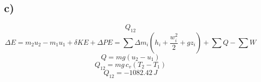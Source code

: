 

\subsection*{c)}
\[
Q_{12}
\]
\[
\Delta E = m_2 u_2 - m_1 u_1 + \delta KE + \Delta PE = \sum \Delta m_i \left( h_i + \frac{w_i^2}{2} + gz_i \right) + \sum Q - \sum W
\]
\[
Q = mg (u_2 - u_1)
\]
\[
Q_{12} = mg \, c_v (T_2 - T_1)
\]
\[
Q_{12} = -1082.42 \, J
\]